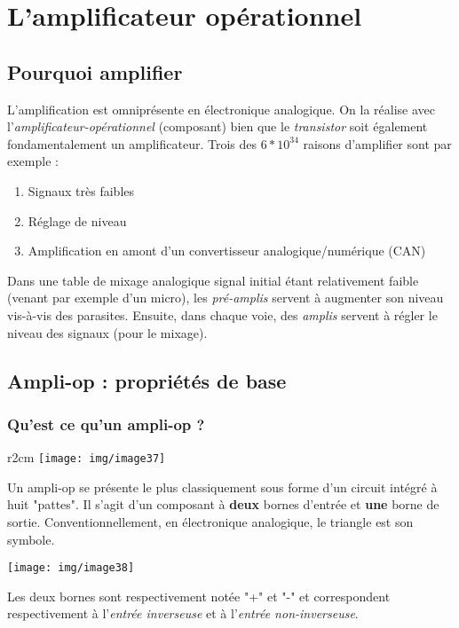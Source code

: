 \chapter{L'amplificateur opérationnel}
\setcounter{section}{-1}
\section{Pourquoi amplifier}
L'amplification est omniprésente en électronique analogique. On la réalise avec l'\textit{amplificateur-opérationnel} (composant) bien que le \textit{transistor} soit également fondamentalement un amplificateur. Trois des $6*10^{34}$ raisons d'amplifier sont par exemple : 
\begin{enumerate}
	\item Signaux très faibles
	\item Réglage de niveau
	\item Amplification en amont d'un convertisseur analogique/numérique (CAN)
\end{enumerate}

Dans une  table de mixage analogique signal initial étant relativement faible (venant par exemple d'un micro), les \textit{pré-amplis} servent à augmenter son niveau vis-à-vis des parasites. Ensuite, dans chaque voie, des \textit{amplis} servent à régler le niveau des signaux (pour le mixage).



\section{Ampli-op : propriétés de base}
\subsection{Qu'est ce qu'un ampli-op ?}
\begin{wrapfigure}[5]{r}{2cm}
	\texttt{[image: img/image37]}
\end{wrapfigure}

Un ampli-op se présente le plus classiquement sous forme d'un circuit intégré à huit "pattes". Il s'agit d'un composant à \textbf{deux} bornes d'entrée et \textbf{une} borne de sortie. Conventionnellement, en électronique analogique, le triangle est son symbole.
\begin{center}
	\texttt{[image: img/image38]}
\end{center}
Les deux bornes sont respectivement notée "+" et "-" et correspondent respectivement à l'\textit{entrée inverseuse} et à l'\textit{entrée non-inverseuse}.

